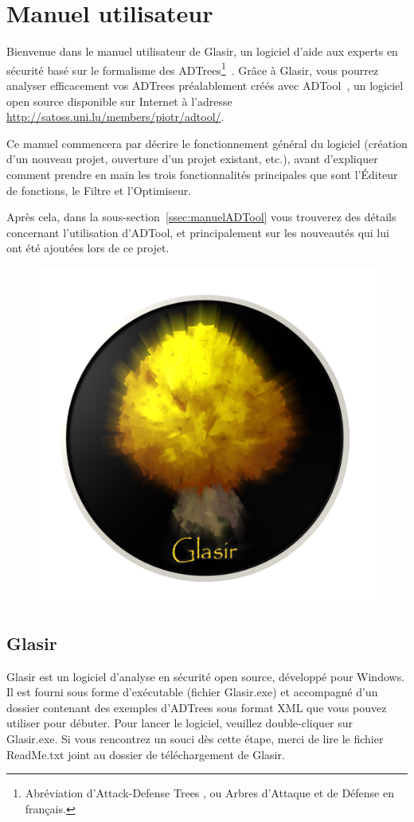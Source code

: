 \section{Manuel utilisateur}
\label{sec:manuel}

Bienvenue dans le manuel utilisateur de Glasir, un logiciel d'aide aux experts en sécurité basé sur le formalisme des ADTrees\footnote{Abréviation d'\og Attack-Defense Trees \fg{}, ou \og Arbres d'Attaque et de Défense\fg{} en français.}~\cite{ADTrees}. Grâce à Glasir, vous pourrez analyser efficacement vos ADTrees préalablement créés avec ADTool~\cite{adtool}, un logiciel open source disponible sur Internet à l'adresse \url{http://satoss.uni.lu/members/piotr/adtool/}.

Ce manuel commencera par décrire le fonctionnement général du logiciel (création d'un nouveau projet, ouverture d'un projet existant, etc.), avant d'expliquer comment prendre en main les trois fonctionnalités principales que sont l'Éditeur de fonctions, le Filtre et l'Optimiseur. 

Après cela, dans la {\sc sous-section}~\ref{ssec:manuelADTool} vous trouverez des détails concernant l'utilisation d'ADTool, et principalement sur les nouveautés qui lui ont été ajoutées lors de ce projet.

	\begin{figure}[H]
        \centering
        \includegraphics[height=0.3\textwidth]{figure/glasir.png}
    \end{figure}

\subsection{Glasir}
\label{ssec:manuelGlasir}

Glasir est un logiciel d'analyse en sécurité open source, développé pour Windows. Il est fourni sous forme d'exécutable (fichier Glasir.exe) et accompagné d'un dossier contenant des exemples d'ADTrees sous format XML que vous pouvez utiliser pour débuter. Pour lancer le logiciel, veuillez double-cliquer sur Glasir.exe. Si vous rencontrez un souci dès cette étape, merci de lire le fichier ReadMe.txt joint au dossier de téléchargement de Glasir.

